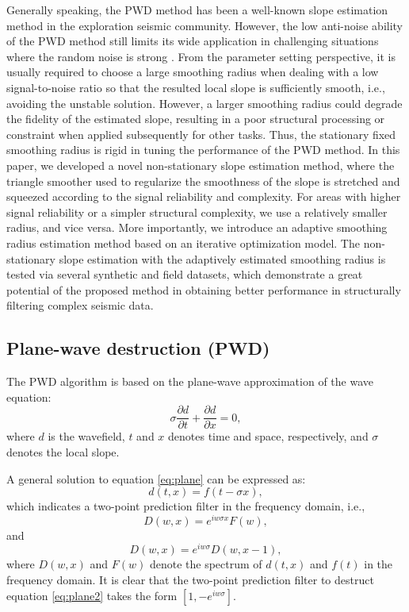 Generally speaking, the PWD method has been a well-known slope estimation method in the exploration seismic community. However, the low anti-noise ability of the PWD method still limits its wide application in challenging situations where the random noise is strong \cite[]{curveletieee2016,yanan2014,weilin2017dlsp,shaohuan2018ieee,zhaoqiang2019tgrs,wang2019hankel}. From the parameter setting perspective, it is usually required to choose a large smoothing radius when dealing with a low signal-to-noise ratio so that the resulted local slope is sufficiently smooth, i.e., avoiding the unstable solution. However, a larger smoothing radius could degrade the fidelity of the estimated slope, resulting in a poor structural processing or constraint when applied subsequently for other tasks. Thus, the stationary fixed smoothing radius is rigid in tuning the performance of the PWD method. In this paper, we developed a novel non-stationary slope estimation method, where the triangle smoother used to regularize the smoothness of the slope is stretched and squeezed according to the signal reliability and complexity. For areas with higher signal reliability or a simpler structural complexity, we use a relatively smaller radius, and vice versa. More importantly, we introduce an adaptive smoothing radius estimation method based on an iterative optimization model. The non-stationary slope estimation with the adaptively estimated smoothing radius is tested via several synthetic and field datasets, which demonstrate a great potential of the proposed method in obtaining better performance in structurally filtering complex seismic data.  

\subsection{Plane-wave destruction (PWD)}
The PWD algorithm is based on the plane-wave approximation of the wave equation:
\begin{equation}
\label{eq:plane}
\sigma \frac{\partial d}{\partial t} + \frac{\partial d}{\partial x} = 0,
\end{equation}
where $d$ is the wavefield, $t$ and $x$ denotes time and space, respectively, and $\sigma$ denotes the local slope. 

A general solution to equation \ref{eq:plane} can be expressed as: 
\begin{equation}
\label{eq:plane}
d(t,x) = f(t-\sigma x),
\end{equation}
which indicates a two-point prediction filter in the frequency domain, i.e.,
\begin{equation}
\label{eq:plane1}
D(w,x) = e^{iw\sigma x}F(w),
\end{equation}
and
\begin{equation}
\label{eq:plane2}
D(w,x) = e^{iw\sigma }D(w,x-1) ,
\end{equation}
where $D(w,x)$ and $F(w)$ denote the spectrum of $d(t,x)$ and $f(t)$ in the frequency domain. It is clear that the two-point prediction filter to destruct equation \ref{eq:plane2} takes the form $[1,-e^{iw\sigma }]$. 

